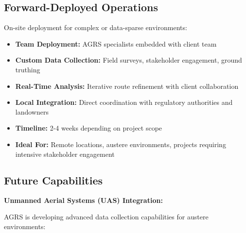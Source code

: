 \documentclass[11pt,letterpaper]{article}
\begin{document}
\subsection{Forward-Deployed Operations}

On-site deployment for complex or data-sparse environments:

\begin{itemize}[leftmargin=*]
    \item \textbf{Team Deployment:} AGRS specialists embedded with client team
    \item \textbf{Custom Data Collection:} Field surveys, stakeholder engagement, ground truthing
    \item \textbf{Real-Time Analysis:} Iterative route refinement with client collaboration
    \item \textbf{Local Integration:} Direct coordination with regulatory authorities and landowners
    \item \textbf{Timeline:} 2-4 weeks depending on project scope
    \item \textbf{Ideal For:} Remote locations, austere environments, projects requiring intensive stakeholder engagement
\end{itemize}

\subsection{Future Capabilities}

\textbf{Unmanned Aerial Systems (UAS) Integration:}

AGRS is developing advanced data collection capabilities for austere environments:
\end{document}
